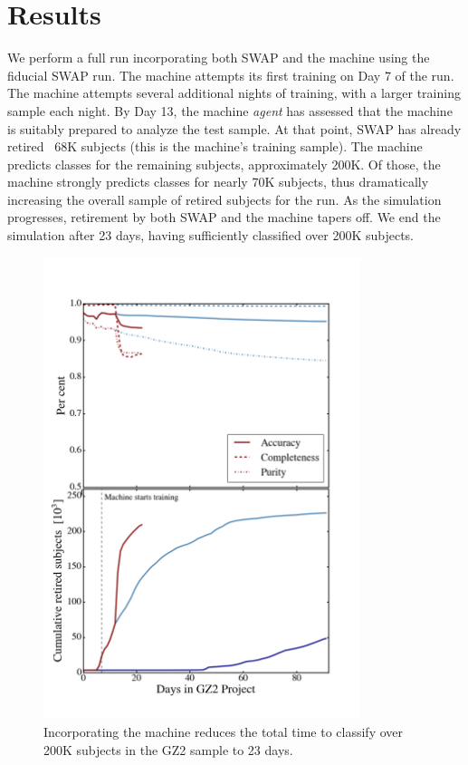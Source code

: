 \documentclass[twocolumn]{aastex6}
\begin{document}
\section{Results}

We perform a full run incorporating both SWAP and the machine using the fiducial SWAP run.
The machine attempts its first training on Day 7 of the run. The machine attempts several 
additional nights of training, with a larger training sample each night. By Day 13, 
the machine \textit{agent} has assessed that the machine is suitably prepared to 
analyze the test sample. At that point, SWAP has already retired ~68K subjects 
(this is the machine's training sample). The machine predicts classes for the remaining
subjects, approximately 200K. Of those, the machine strongly predicts classes for 
nearly 70K subjects, thus dramatically increasing the overall sample of retired 
subjects for the run. As the simulation progresses, retirement by both SWAP and
the machine tapers off. We end the simulation after 23 days, having sufficiently 
classified over 200K subjects. 

\begin{figure}[t!]
\includegraphics[width=3.65in]{figures/moneyplot.png}
\caption{Incorporating the machine reduces the total time to classify over 200K subjects in the GZ2 sample to 23 days. \label{fig: money}}
\end{figure}
\end{document}
